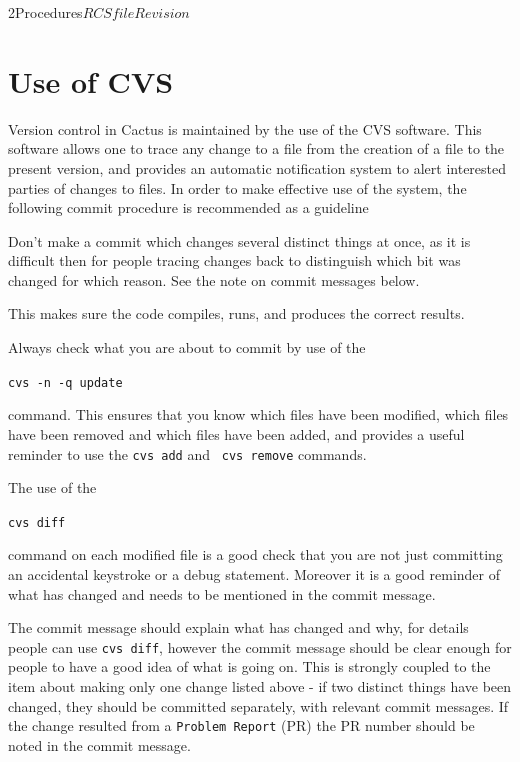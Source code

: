 
\begin{cactuspart}{2}{Procedures}{$RCSfile$}{$Revision$}
\renewcommand{\thepage}{\Alph{part}\arabic{page}}


\chapter{Use of CVS} 

Version control in Cactus is maintained by the use of the CVS
software.  This software allows one to trace any change to a file from 
the creation of a file to the present version, and provides an
automatic notification system to alert interested parties of changes
to files.  In order to make effective use of the system, the following 
commit procedure is recommended as a guideline

\begin{Lentry}
\item[{\em Only make one change at a time}]
Don't make a commit which changes several distinct things at once, as
it is difficult then for people tracing changes back to distinguish
which bit was changed for which reason.  See the note on commit
messages below.
\item[{\em Run the test suite}]
This makes sure the code compiles, runs, and produces the correct results. 
\item[{\em Know which files you are going to commit}]
Always check what you are about to commit by use of the

{\tt cvs -n -q update} 

command.  This ensures that you know which files have been modified,
which files have been removed and which files have been added, and
provides a useful reminder to use the {\tt \verb.cvs add.} and {\tt
\verb.cvs remove.} commands.
\item[{\em Know what has changed}]
The use of the

{\tt cvs diff} 

command on each modified file is a good check that you are not just
committing an accidental keystroke or a debug statement.  Moreover it
is a good reminder of what has changed and needs to be mentioned in
the commit message.
\item[{\em Provide clear and meaningful and relevant commit messages}]
The commit message should explain what has changed and why, for
details people can use {\tt \verb.cvs diff.}, however the commit
message should be clear enough for people to have a good idea of what
is going on.  This is strongly coupled to the item about making only
one change listed above - if two distinct things have been changed,
they should be committed separately, with relevant commit messages.
If the change resulted from a {\tt Problem Report} (PR) the PR number
should be noted in the commit message.
\end{Lentry}


\end{cactuspart}
